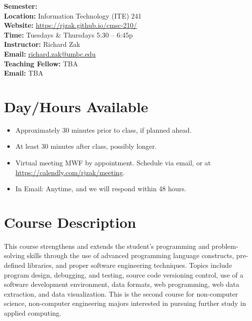 \documentclass[letter,10pt]{article}
\begin{document}
\textbf{Semester:} \\
\textbf{Location:} Information Technology (ITE) 241 \\
\textbf{Website:} \url{https://rjzak.github.io/cmsc-210/} \\
\textbf{Time:} Tuesdays \& Thursdays 5:30 -- 6:45p \\
\textbf{Instructor:} Richard Zak \\
\textbf{Email:} \href{mailto:richard.zak@umbc.edu?Subject=CMSC210}{richard.zak@umbc.edu} \\
\textbf{Teaching Fellow:} TBA \\
\textbf{Email:} TBA

\section*{Day/Hours Available}
\begin{itemize}
\item Approximately 30 minutes prior to class, if planned ahead.
\item At least 30 minutes after class, possibly longer.
\item Virtual meeting MWF by appointment. Schedule via email, or at \url{https://calendly.com/rjzak/meeting}.
\item In Email: Anytime, and we will respond within 48 hours.
\end{itemize}


\section*{Course Description}
\paragraph{}This course strengthens and extends the student's programming and problem-solving skills through the use of advanced programming language constructs, pre-defined libraries, and proper software engineering techniques. Topics include program design, debugging, and testing, source code versioning control, use of a software development environment, data formats, web programming, web data extraction, and data visualization. This is the second course for non-computer science, non-computer engineering majors interested in pursuing further study in applied computing.
\end{document}

